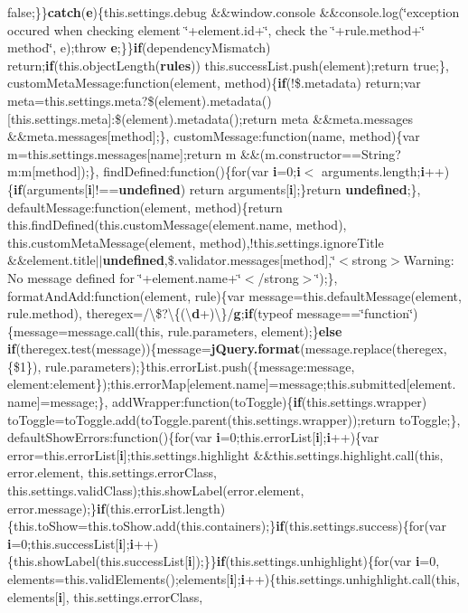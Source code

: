{{\begin{DoxyParamCaption}
false;\}\}{\bf catch}({\bf e})\{this.\+settings.\+debug \&\&window.\+console \&\&console.\+log(\char`\"{}exception occured when checking element \char`\"{}+element.\+id+\char`\"{}, check the \textquotesingle{}\char`\"{}+rule.\+method+\char`\"{}\textquotesingle{} method\char`\"{}, e);throw {\bf e};\}\}{\bf if}(dependency\+Mismatch) return;{\bf if}(this.\+object\+Length({\bf rules})) this.\+success\+List.\+push(element);return true;\},   custom\+Meta\+Message\+:function(element, method)\{{\bf if}(!\$.metadata) return;var meta=this.\+settings.\+meta?\$(element).metadata()\mbox{[}this.\+settings.\+meta\mbox{]}\+:\$(element).metadata();return meta \&\&meta.\+messages \&\&meta.\+messages\mbox{[}method\mbox{]};\}, custom\+Message\+:function(name, method)\{var m=this.\+settings.\+messages\mbox{[}name\mbox{]};return m \&\&(m.\+constructor==String?m\+:m\mbox{[}method\mbox{]});\}, find\+Defined\+:function()\{for(var {\bf i}=0;{\bf i}$<$ arguments.\+length;{\bf i}++)\{{\bf if}(arguments\mbox{[}{\bf i}\mbox{]}!=={\bf undefined}) return arguments\mbox{[}{\bf i}\mbox{]};\}return {\bf undefined};\}, default\+Message\+:function(element, method)\{return this.\+find\+Defined(this.\+custom\+Message(element.\+name, method), this.\+custom\+Meta\+Message(element, method),!this.\+settings.\+ignore\+Title \&\&element.\+title$\vert$$\vert${\bf undefined},\$.validator.\+messages\mbox{[}method\mbox{]},\char`\"{}$<$strong$>$Warning\+: No message defined for \char`\"{}+element.\+name+\char`\"{}$<$/strong$>$\char`\"{});\}, format\+And\+Add\+:function(element, rule)\{var message=this.\+default\+Message(element, rule.\+method), theregex=/\textbackslash{}\$?\textbackslash{}\{(\textbackslash{}{\bf d}+)\textbackslash{}\}/{\bf g};{\bf if}(typeof message==\char`\"{}function\char`\"{})\{message=message.\+call(this, rule.\+parameters, element);\}{\bf else} {\bf if}(theregex.\+test(message))\{message={\bf j\+Query.\+format}(message.\+replace(theregex, \textquotesingle{}\{\$1\}\textquotesingle{}), rule.\+parameters);\}this.\+error\+List.\+push(\{message\+:message, element\+:element\});this.\+error\+Map\mbox{[}element.\+name\mbox{]}=message;this.\+submitted\mbox{[}element.\+name\mbox{]}=message;\}, add\+Wrapper\+:function(to\+Toggle)\{{\bf if}(this.\+settings.\+wrapper) to\+Toggle=to\+Toggle.\+add(to\+Toggle.\+parent(this.\+settings.\+wrapper));return to\+Toggle;\}, default\+Show\+Errors\+:function()\{for(var {\bf i}=0;this.\+error\+List\mbox{[}{\bf i}\mbox{]};{\bf i}++)\{var error=this.\+error\+List\mbox{[}{\bf i}\mbox{]};this.\+settings.\+highlight \&\&this.\+settings.\+highlight.\+call(this, error.\+element, this.\+settings.\+error\+Class, this.\+settings.\+valid\+Class);this.\+show\+Label(error.\+element, error.\+message);\}{\bf if}(this.\+error\+List.\+length)\{this.\+to\+Show=this.\+to\+Show.\+add(this.\+containers);\}{\bf if}(this.\+settings.\+success)\{for(var {\bf i}=0;this.\+success\+List\mbox{[}{\bf i}\mbox{]};{\bf i}++)\{this.\+show\+Label(this.\+success\+List\mbox{[}{\bf i}\mbox{]});\}\}{\bf if}(this.\+settings.\+unhighlight)\{for(var {\bf i}=0, elements=this.\+valid\+Elements();elements\mbox{[}{\bf i}\mbox{]};{\bf i}++)\{this.\+settings.\+unhighlight.\+call(this, elements\mbox{[}{\bf i}\mbox{]}, this.\+settings.\+error\+Class, 
\end{DoxyParamCaption}}}
